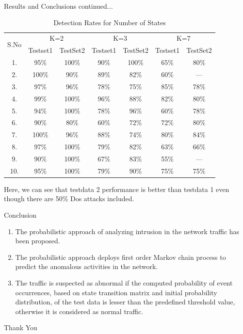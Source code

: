 \documentclass{beamer}
\begin{document}
\begin{frame}{Results and Conclusions continued...}
\begin{table}[h!]
    \centering
    \hline
    \hline
    \begin{tabular}{|c|c|c|c|c|c|c|}
        \multirow{2}{2em}{S.No} & \multicolumn{2}{|c|}{K=2} & \multicolumn{2}{|c|}{K=3} & \multicolumn{2}{|c|}{K=7}\\
        & Testset1 & TestSet2 & Testset1 & TestSet2 & Testset1 & TestSet2\\
        \hline
        1. & 95\% & 100\% & 90\% & 100\% & 65\% & 80\% \\
        2. & 100\% & 90\% & 89\% & 82\% & 60\% & ---\\
        3. & 97\% & 96\% & 78\% & 75\% & 85\% & 78\% \\
        4. & 99\% & 100\% & 96\% & 88\% & 82\% & 80\% \\
        5. & 94\% & 100\% & 78\% & 96\% & 60\% & 78\% \\
        6. & 90\% & 80\% & 60\% & 72\% & 72\% & 80\% \\
        7. & 100\% & 96\% & 88\% & 74\% & 80\% & 84\% \\
        8. & 97\% & 100\% & 79\% & 82\% & 63\% & 66\% \\
        9. & 90\% & 100\% & 67\% & 83\% & 55\% & ---\\
        10. & 95\% & 100\% & 79\% & 90\% & 75\% & 75\% \\
        \hline
        \hline
    \end{tabular}
    \caption{Detection Rates for Number of States}
    \label{tab:my_label}
\end{table}
Here, we can see that testdata 2 performance is better than testdata 1 even though there are 50\% Dos attacks included.
\end{frame}
\begin{frame}
\begin{block}{Conclusion}
\begin{enumerate}
    \item The probabilistic approach of analyzing intrusion in the network traffic has been proposed.
    \item The probabilistic approach deploys first order Markov chain process to predict the anomalous activities in the network.
    \item The traffic is suspected as abnormal if the computed probability of event occurrences, based on state transition matrix and initial probability distribution, of the test data is lesser than the predefined threshold value, otherwise it is considered as normal traffic.
\end{enumerate}
\end{block}
\end{frame}
\begin{frame}
\begin{center}
    \Huge{Thank You}
\end{center}
\end{frame}
\end{document}
